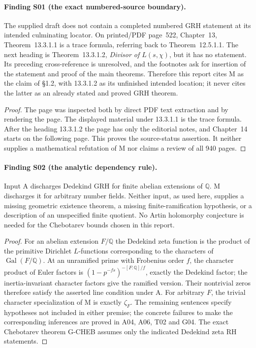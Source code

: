 \documentclass[11pt,a4paper]{article}
\begin{document}
\paragraph{Finding S01 (the exact numbered-source boundary).}
The supplied draft does not contain a completed numbered GRH
statement at its intended culminating locator. On printed/PDF
page~522, Chapter~13, Theorem~13.3.1.1 is a trace formula, referring
back to Theorem~12.5.1.1. The next heading is
Theorem~13.3.1.2, \emph{Divisor of $L(s,\chi)$}, but it has no
statement. Its preceding cross-reference is unresolved, and the
footnotes ask for insertion of the statement and proof of the main
theorems. Therefore this report cites M as the claim of \S1.2, with
13.3.1.2 as its unfinished intended location; it never cites the
latter as an already stated and proved GRH theorem.

\begin{proof}
The page was inspected both by direct PDF text extraction and by
rendering the page. The displayed material under 13.3.1.1 is the
trace formula. After the heading 13.3.1.2 the page has only the
editorial notes, and Chapter~14 starts on the following page.
This proves the source-status assertion. It neither supplies a
mathematical refutation of M nor claims a review of all 940 pages.
\end{proof}

\paragraph{Finding S02 (the analytic dependency rule).}
Input A discharges Dedekind GRH for finite abelian extensions of
$\mathbb Q$. M discharges it for arbitrary number fields. Neither
input, as used here, supplies a missing geometric existence theorem,
a missing finite-ramification hypothesis, or a description of an
unspecified finite quotient. No Artin holomorphy conjecture is needed
for the Chebotarev bounds chosen in this report.

\begin{proof}
For an abelian extension $F/\mathbb Q$ the Dedekind zeta function
is the product of the primitive Dirichlet $L$-functions corresponding to the
characters of $\operatorname{Gal}(F/\mathbb Q)$. At an unramified
prime with Frobenius order $f$, the character product of Euler
factors is $(1-p^{-fs})^{-[F:\mathbb Q]/f}$, exactly the Dedekind
factor; the inertia-invariant character factors give the ramified
version. Their nontrivial
zeros therefore satisfy the asserted line condition under A.
For arbitrary $F$, the trivial character specialization of M is
exactly $\zeta_F$. The remaining sentences specify hypotheses not
included in either premise; the concrete failures to make the
corresponding inferences are proved in A04, A06, T02 and G04.
The exact Chebotarev theorem G-CHEB assumes only the indicated
Dedekind zeta RH statements.
\end{proof}
\end{document}
